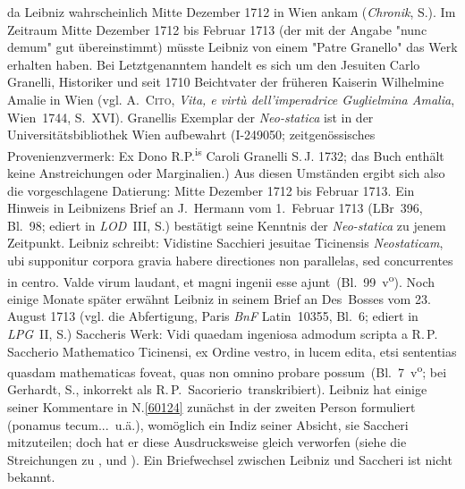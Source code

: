 \begin{ledgroup}
da Leibniz wahrscheinlich Mitte Dezember 1712 in Wien ankam (\cite{01236}\textit{Chronik}, S.).
Im Zeitraum Mitte Dezember 1712 bis Februar 1713 (der mit der Angabe "nunc demum" gut übereinstimmt) müsste Leibniz von einem "Patre Granello" das Werk erhalten haben.
Bei Letztgenanntem handelt es sich 
um den Jesuiten Carlo Granelli, 
Historiker und seit 1710 Beichtvater der früheren
Kaiserin Wilhelmine Amalie 
in Wien
(vgl. \textsc{A.~Cito}, \textit{Vita, e virtù dell'imperadrice Guglielmina Amalia}, Wien~1744, S.~\lbrack XVI\rbrack). 
Granellis Exemplar der \textit{Neo-statica} ist in der Universitätsbibliothek Wien aufbewahrt (I-249050; zeitgenössisches Provenienzvermerk: \glqq Ex Dono R.\;P.\textsuperscript{is} Caroli Granelli S.\,J. 1732\grqq; das Buch enthält keine Anstreichungen oder Marginalien.) 
Aus diesen Umständen ergibt sich also die vorgeschlagene Datierung: Mitte Dezember 1712 bis Februar 1713.
\pend
\pstart
Ein Hinweis in Leibnizens
\cite{02124}Brief an J.~Hermann 
vom 1.~Februar 1713
(LBr~396, Bl.~98; ediert in \cite{00150}\textit{LOD}~III, S.)
bestätigt seine Kenntnis der \cite{00541}\textit{Neo-statica} zu jenem Zeitpunkt.
Leibniz schreibt: \glqq Vidistine Sacchieri jesuitae Ticinensis \textit{Neostaticam}, ubi supponitur corpora gravia habere directiones non parallelas, sed concurrentes in centro. Valde virum laudant, et magni ingenii esse ajunt\grqq\ (Bl.~99~v\textsuperscript{o}).
Noch einige Monate später erwähnt Leibniz in seinem
\cite{02123}Brief an Des~Bosses 
vom 23. August 1713 (vgl. die Abfertigung, Paris \textit{BnF} Latin~10355, Bl.~6; ediert in \cite{02039}\textit{LPG}~II, S.)
Saccheris Werk:
\glqq Vidi quaedam ingeniosa admodum scripta a R.\,P. Saccherio Mathematico Ticinensi, ex Ordine vestro, in lucem edita, etsi sententias quasdam mathematicas foveat, quas non omnino probare possum\grqq\ (Bl.~7~v\textsuperscript{o}; bei \cite{02039}Gerhardt, S., inkorrekt als \glqq R.\,P.~Sacorierio\grqq\ transkribiert).
\pend
\pstart
Leibniz hat einige seiner Kommentare in N.\;\ref{60124}
zunächst in der zweiten Person formuliert (\glqq ponamus tecum...\grqq\ u.ä.),
womöglich ein Indiz seiner Absicht, sie Saccheri mitzuteilen;
doch hat er diese Ausdrucksweise gleich verworfen
(siehe die Streichungen zu ,  und ).
Ein Briefwechsel zwischen Leibniz und Saccheri ist nicht bekannt.
\pend
\end{ledgroup}
